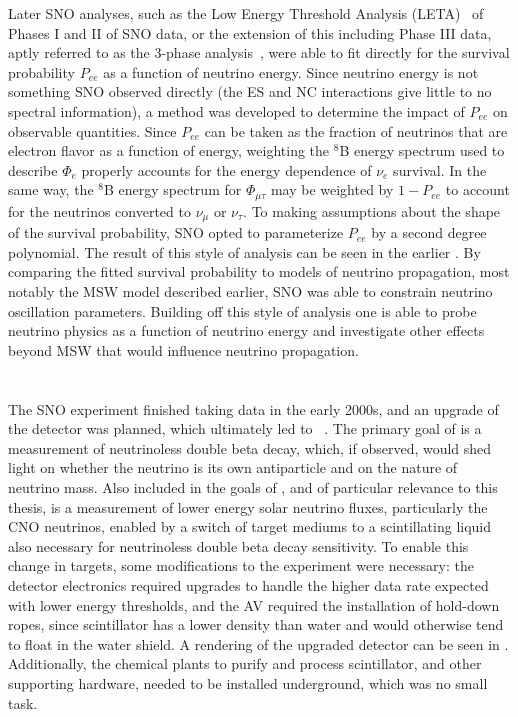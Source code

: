 Later SNO analyses, such as the Low Energy Threshold Analysis (LETA)~\cite{leta} of Phases I and II of SNO data, or the extension of this including Phase III data, aptly referred to as the 3-phase analysis~\cite{sno}, were able to fit directly for the survival probability $P_{ee}$ as a function of neutrino energy.
Since neutrino energy is not something SNO observed directly (the ES and NC interactions give little to no spectral information), a method was developed to determine the impact of $P_{ee}$ on observable quantities.
Since $P_{ee}$ can be taken as the fraction of neutrinos that are electron flavor as a function of energy, weighting the $^8$B energy spectrum used to describe $\Phi_e$ properly accounts for the energy dependence of $\nu_e$ survival.
In the same way, the $^8$B energy spectrum for $\Phi_{\mu\tau}$ may be weighted by $1-P_{ee}$ to account for the neutrinos converted to $\nu_\mu$ or $\nu_\tau$.
To making assumptions about the shape of the survival probability, SNO opted to parameterize $P_{ee}$ by a second degree polynomial.
The result of this style of analysis can be seen in the earlier .
By comparing the fitted survival probability to models of neutrino propagation, most notably the MSW model described earlier, SNO was able to constrain neutrino oscillation parameters.
Building off this style of analysis one is able to probe neutrino physics as a function of neutrino energy and investigate other effects beyond MSW that would influence neutrino propagation.

\section{\texorpdfstring{\snop}{SNO+}}

The SNO experiment finished taking data in the early 2000s, and an upgrade of the detector was planned, which ultimately led to {\snop}~\cite{snop}.
The primary goal of {\snop} is a measurement of neutrinoless double beta decay, which, if observed, would shed light on whether the neutrino is its own antiparticle and on the nature of neutrino mass.
Also included in the goals of {\snop}, and of particular relevance to this thesis, is a measurement of lower energy solar neutrino fluxes, particularly the CNO neutrinos, enabled by a switch of target mediums to a scintillating liquid also necessary for neutrinoless double beta decay sensitivity.
To enable this change in targets, some modifications to the experiment were necessary: the detector electronics required upgrades to handle the higher data rate expected with lower energy thresholds, and the AV required the installation of hold-down ropes, since scintillator has a lower density than water and would otherwise tend to float in the water shield.
A rendering of the upgraded detector can be seen in .
Additionally, the chemical plants to purify and process scintillator, and other supporting hardware, needed to be installed underground, which was no small task.


